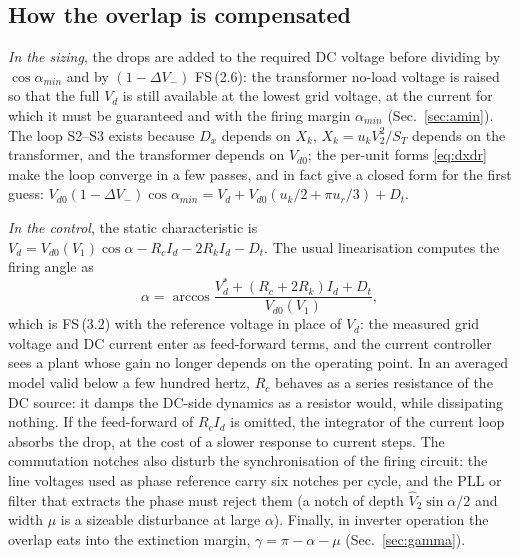 \documentclass[10pt,a4paper]{scrartcl}
\newcommand{\Vdo}{V_{d0}}
\newcommand{\Vd}{V_{d}}
\newcommand{\Id}{I_{d}}
\newcommand{\Vll}{V_{2}}
\newcommand{\Xk}{X_{k}}
\newcommand{\Rk}{R_{k}}
\newcommand{\uk}{u_{k}}
\newcommand{\ur}{u_{r}}
\newcommand{\Dx}{D_{x}}
\newcommand{\Dt}{D_{t}}
\newcommand{\fs}[1]{\textsf{FS}\,(#1)}
\begin{document}
\subsection{How the overlap is compensated}\label{sec:comp}
\emph{In the sizing}, the drops are added to the required DC voltage before dividing by $\cos\alpha_{min}$ and by $(1-\Delta V_-)$ \fs{2.6}: the transformer no-load voltage is raised so that the full $\Vd$ is still available at the lowest grid voltage, at the current for which it must be guaranteed and with the firing margin $\alpha_{min}$ (Sec.~\ref{sec:amin}). The loop S2--S3 exists because $\Dx$ depends on $\Xk$, $\Xk = \uk\Vll^2/S_T$ depends on the transformer, and the transformer depends on $\Vdo$; the per-unit forms \eqref{eq:dxdr} make the loop converge in a few passes, and in fact give a closed form for the first guess: $\Vdo(1-\Delta V_-)\cos\alpha_{min} = \Vd + \Vdo(\uk/2 + \pi\ur/3) + \Dt$.

\emph{In the control}, the static characteristic is $\Vd = \Vdo(V_1)\cos\alpha - R_c\Id - 2\Rk\Id - \Dt$. The usual linearisation computes the firing angle as
\begin{equation}
\alpha = \arccos\frac{\Vd^{*} + (R_c + 2\Rk)\Id + \Dt}{\Vdo(V_1)} ,
\label{eq:arccos}
\end{equation}
which is \fs{3.2} with the reference voltage in place of $\Vd$: the measured grid voltage and DC current enter as feed-forward terms, and the current controller sees a plant whose gain no longer depends on the operating point. In an averaged model valid below a few hundred hertz, $R_c$ behaves as a series resistance of the DC source: it damps the DC-side dynamics as a resistor would, while dissipating nothing. If the feed-forward of $R_c\Id$ is omitted, the integrator of the current loop absorbs the drop, at the cost of a slower response to current steps. The commutation notches also disturb the synchronisation of the firing circuit: the line voltages used as phase reference carry six notches per cycle, and the PLL or filter that extracts the phase must reject them (a notch of depth $\hat V_2\sin\alpha/2$ and width $\mu$ is a sizeable disturbance at large $\alpha$). Finally, in inverter operation the overlap eats into the extinction margin, $\gamma = \pi - \alpha - \mu$ (Sec.~\ref{sec:gamma}).
\end{document}
